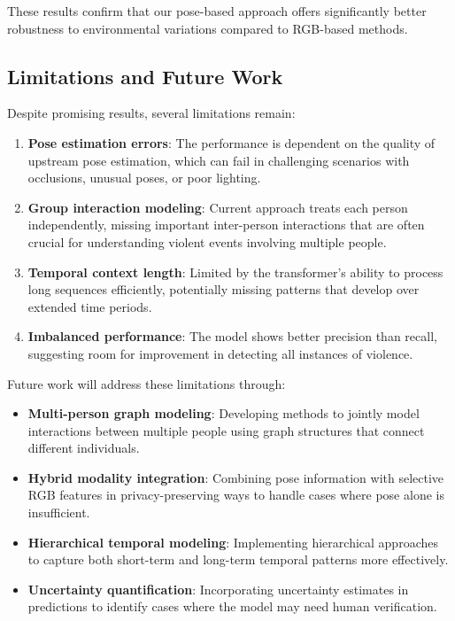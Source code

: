 \documentclass[conference]{IEEEtran}
\begin{document}
These results confirm that our pose-based approach offers significantly better
robustness to environmental variations compared to RGB-based methods.

\subsection{Limitations and Future Work}
Despite promising results, several limitations remain:

\begin{enumerate}
    \item \textbf{Pose estimation errors}: The performance is dependent on the quality of upstream pose estimation, which can fail in challenging scenarios with occlusions, unusual poses, or poor lighting.

    \item \textbf{Group interaction modeling}: Current approach treats each person independently, missing important inter-person interactions that are often crucial for understanding violent events involving multiple people.

    \item \textbf{Temporal context length}: Limited by the transformer's ability to process long sequences efficiently, potentially missing patterns that develop over extended time periods.

    \item \textbf{Imbalanced performance}: The model shows better precision than recall, suggesting room for improvement in detecting all instances of violence.
\end{enumerate}

Future work will address these limitations through:

\begin{itemize}
    \item \textbf{Multi-person graph modeling}: Developing methods to jointly model interactions between multiple people using graph structures that connect different individuals.

    \item \textbf{Hybrid modality integration}: Combining pose information with selective RGB features in privacy-preserving ways to handle cases where pose alone is insufficient.

    \item \textbf{Hierarchical temporal modeling}: Implementing hierarchical approaches to capture both short-term and long-term temporal patterns more effectively.

    \item \textbf{Uncertainty quantification}: Incorporating uncertainty estimates in predictions to identify cases where the model may need human verification.
\end{itemize}
\end{document}
